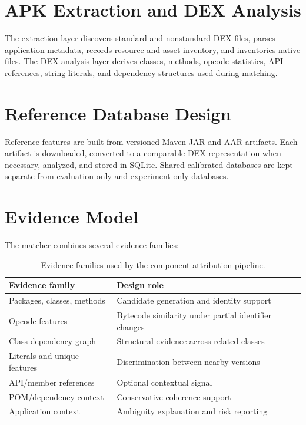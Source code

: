 \section{APK Extraction and DEX Analysis}

The extraction layer discovers standard and nonstandard DEX files, parses
application metadata, records resource and asset inventory, and inventories
native files. The DEX analysis layer derives classes, methods, opcode
statistics, API references, string literals, and dependency structures used
during matching.

\section{Reference Database Design}

Reference features are built from versioned Maven JAR and AAR artifacts. Each
artifact is downloaded, converted to a comparable DEX representation when
necessary, analyzed, and stored in SQLite. Shared calibrated databases are
kept separate from evaluation-only and experiment-only databases.

\section{Evidence Model}

The matcher combines several evidence families:

\begin{table}[H]
\centering
\caption{Evidence families used by the component-attribution pipeline.}
\label{tab:pfe-evidence-families}
\begin{tabularx}{\textwidth}{L{0.27\textwidth}X}
\toprule
\textbf{Evidence family} & \textbf{Design role}\\
\midrule
Packages, classes, methods & Candidate generation and identity support\\
Opcode features & Bytecode similarity under partial identifier changes\\
Class dependency graph & Structural evidence across related classes\\
Literals and unique features & Discrimination between nearby versions\\
API/member references & Optional contextual signal\\
POM/dependency context & Conservative coherence support\\
Application context & Ambiguity explanation and risk reporting\\
\bottomrule
\end{tabularx}
\end{table}

